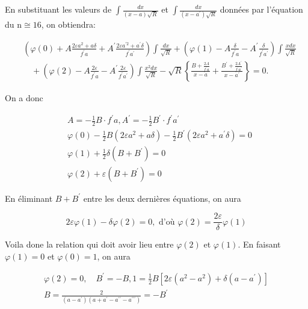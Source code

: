 \documentclass{article}
\begin{document}
En substituant les valeurs de \(\int \frac{d x}{(x-a) \sqrt{R}}\) et \(\int \frac{d x}{\left(x-a^{\prime}\right) \sqrt{R}}\) données par l'équation du \(\mathrm{n} \cong 16\), on obtiendra:

\[
\begin{aligned}
& \left(\varphi(0)+A \frac{2 \varepsilon a^{2}+a \delta}{f^{\prime} a}+A^{\prime} \frac{2 \varepsilon a^{\prime 2}+a^{\prime} \delta}{f^{\prime} a^{\prime}}\right) \int \frac{d x}{\sqrt{R}}+\left(\varphi(1)-A \frac{\delta}{f^{\prime} a}-A^{\prime} \frac{\delta}{f^{\prime} a^{\prime}}\right) \int \frac{x d x}{\sqrt{R}} \\
& \quad+\left(\varphi(2)-A \frac{2 \varepsilon}{f^{\prime} a}-A^{\prime} \frac{2 \varepsilon}{f^{\prime} a^{\prime}}\right) \int \frac{x^{2} d x}{\sqrt{R}}-\sqrt{R}\left\{\frac{B+\frac{2 A}{f^{\prime} a}}{x-a}+\frac{B^{\prime}+\frac{2 A^{\prime}}{f^{\prime} a^{\prime}}}{x-a^{\prime}}\right\}=0 .
\end{aligned}
\]

On a donc

\[
\begin{aligned}
& A=-\frac{1}{2} B \cdot f^{\prime} a, A^{\prime}=-\frac{1}{2} B^{\prime} \cdot f^{\prime} a^{\prime} \\
& \varphi(0)-\frac{1}{2} B\left(2 \varepsilon a^{2}+a \delta\right)-\frac{1}{2} B^{\prime}\left(2 \varepsilon a^{2}+a^{\prime} \delta\right)=0 \\
& \varphi(1)+\frac{1}{2} \delta\left(B+B^{\prime}\right)=0 \\
& \varphi(2)+\varepsilon\left(B+B^{\prime}\right)=0
\end{aligned}
\]

En éliminant \(B+B^{\prime}\) entre les deux dernières équations, on aura

\[
2 \varepsilon \varphi(1)-\delta \varphi(2)=0, \text { d'où } \varphi(2)=\frac{2 \varepsilon}{\delta} \varphi(1)
\]

Voila done la relation qui doit avoir lieu entre \(\varphi(2)\) et \(\varphi(1)\). En faisant \(\varphi(1)=0\) et \(\varphi(0)=1\), on aura

\[
\begin{gathered}
\varphi(2)=0, \quad B^{\prime}=-B, 1=\frac{1}{2} B\left[2 \varepsilon\left(a^{2}-a^{2}\right)+\delta\left(a-a^{\prime}\right)\right] \\
B=\frac{2}{\left(a-a^{\prime}\right)\left(a+a^{\prime}-a^{\prime \prime}-a^{\prime \prime \prime}\right)}=-B^{\prime}
\end{gathered}
\]
\end{document}
